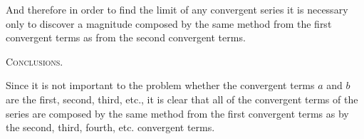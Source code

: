 \documentclass[11pt,letterpaper]{book}
\begin{document}
And therefore in order to find the limit of any convergent series it is
necessary only to discover a magnitude composed by the same method from the
first convergent terms as from the second convergent terms.

\begin{samepage}
\begin{center}
\large\textsc{Conclusions.}
\end{center}

Since it is not important to the problem whether the convergent terms $a$ and
$b$ are the first, second, third, etc., it is clear that all of the convergent
terms of the series are composed by the same method from the first convergent
terms as by the second, third, fourth, etc. convergent terms.
\end{samepage}

\end{document}
